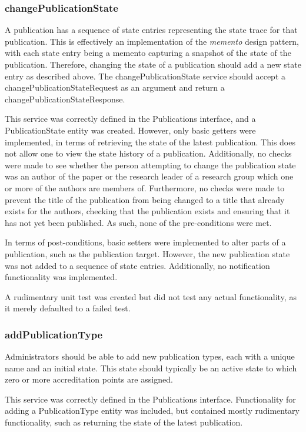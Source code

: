 \documentclass[a4paper,10pt]{article}
\begin{document}
\subsubsection{changePublicationState}
A publication has a sequence of state entries representing the state trace for that publication. This is effectively an implementation of the \textit{memento} design pattern, with each state entry being a memento capturing a snapshot of the state of the publication. Therefore, changing the state of a publication should add a new state entry as described above. The changePublicationState service should accept a changePublicationStateRequest as an argument and return a changePublicationStateResponse.

This service was correctly defined in the Publications interface, and a PublicationState entity was created. However, only basic getters were implemented, in terms of retrieving the state of the latest publication. This does not allow one to view the state history of a publication. Additionally, no checks were made to see whether the person attempting to change the publication state was an author of the paper or the research leader of a research group which one or more of the authors are members of. Furthermore, no checks were made to prevent the title of the publication from being changed to a title that already exists for the authors, checking that the publication exists and ensuring that it has not yet been published. As such, none of the pre-conditions were met.

In terms of post-conditions, basic setters were implemented to alter parts of a publication, such as the publication target. However, the new publication state was not added to a sequence of state entries. Additionally, no notification functionality was implemented.

A rudimentary unit test was created but did not test any actual functionality, as it merely defaulted to a failed test.

\subsubsection{addPublicationType}
Administrators should be able to add new publication types, each with a unique name and an initial state. This state should typically be an active state to which zero or more accreditation points are assigned.

This service was correctly defined in the Publications interface. Functionality for adding a PublicationType entity was included, but contained mostly rudimentary functionality, such as returning the state of the latest publication.
\end{document}
